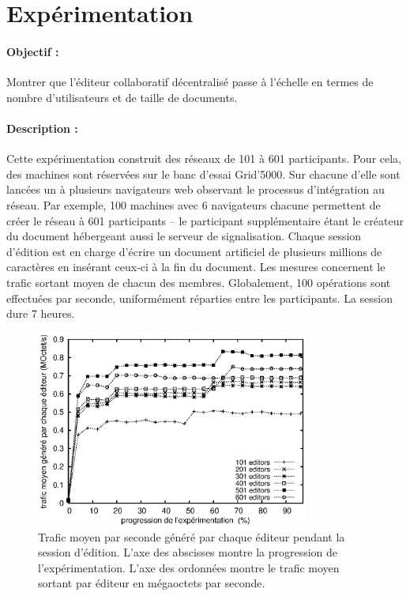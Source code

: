 
\section{Expérimentation}
\label{editor:sec:experimentation}

\paragraph{Objectif :} Montrer que l'éditeur collaboratif décentralisé \CRATE
passe à l'échelle en termes de nombre d'utilisateurs et de taille de
documents.

\paragraph{Description :} Cette expérimentation construit des réseaux de 101 à
601 participants. Pour cela, des machines sont réservées sur le banc d'essai
Grid'5000. Sur chacune d'elle sont lancées un à plusieurs navigateurs web
observant le processus d'intégration au réseau. Par exemple, 100 machines avec 6
navigateurs chacune permettent de créer le réseau à 601 participants -- le
participant supplémentaire étant le créateur du document hébergeant aussi le
serveur de signalisation.  Chaque session d'édition est en charge d'écrire un
document artificiel de plusieurs millions de caractères en insérant ceux-ci à la
fin du document. Les mesures concernent le trafic sortant moyen de chacun des
membres. Globalement, 100 opérations sont effectuées par seconde, uniformément
réparties entre les participants. La session dure 7 heures.

\begin{figure}
  \begin{center}
    \includegraphics[width=0.8\textwidth]{img/editor/communication.eps}
    \caption[Trafic généré par \CRATE lors de sessions d'édition]
    {\label{editor:img:communication} Trafic moyen par seconde généré par chaque
      éditeur pendant la session d'édition. L'axe des abscisses montre la
      progression de l'expérimentation. L'axe des ordonnées montre le trafic
      moyen sortant par éditeur en mégaoctets par seconde.}
  \end{center}
\end{figure}

